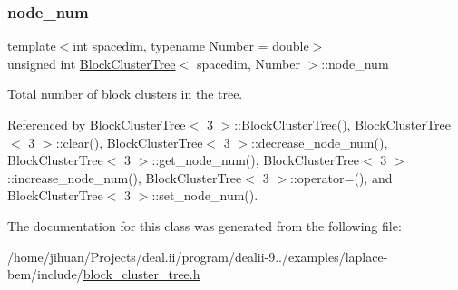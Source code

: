 \mbox{\label{classBlockClusterTree_a75757146cea0aa0e9271b760b1d76307}} 
\subsubsection{\texorpdfstring{node\+\_\+num}{node\_num}}
{\footnotesize\ttfamily template$<$int spacedim, typename Number = double$>$ \\
unsigned int \hyperlink{classBlockClusterTree}{Block\+Cluster\+Tree}$<$ spacedim, Number $>$\+::node\+\_\+num\hspace{0.3cm}{\ttfamily [private]}}

Total number of block clusters in the tree. 

Referenced by Block\+Cluster\+Tree$<$ 3 $>$\+::\+Block\+Cluster\+Tree(), Block\+Cluster\+Tree$<$ 3 $>$\+::clear(), Block\+Cluster\+Tree$<$ 3 $>$\+::decrease\+\_\+node\+\_\+num(), Block\+Cluster\+Tree$<$ 3 $>$\+::get\+\_\+node\+\_\+num(), Block\+Cluster\+Tree$<$ 3 $>$\+::increase\+\_\+node\+\_\+num(), Block\+Cluster\+Tree$<$ 3 $>$\+::operator=(), and Block\+Cluster\+Tree$<$ 3 $>$\+::set\+\_\+node\+\_\+num().



The documentation for this class was generated from the following file\+:\begin{DoxyCompactItemize}
\item 
/home/jihuan/\+Projects/deal.\+ii/program/dealii-\/9../examples/laplace-\/bem/include/\hyperlink{block__cluster__tree_8h}{block\+\_\+cluster\+\_\+tree.\+h}\end{DoxyCompactItemize}
